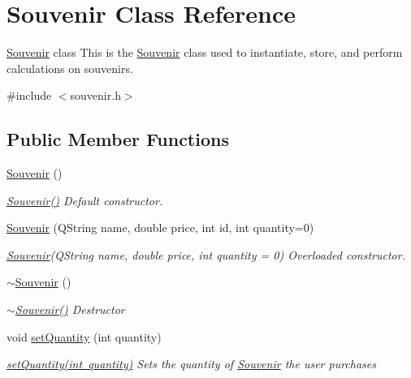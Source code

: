\hypertarget{class_souvenir}{}\section{Souvenir Class Reference}
\label{class_souvenir}


\mbox{\hyperlink{class_souvenir}{Souvenir}} class This is the \mbox{\hyperlink{class_souvenir}{Souvenir}} class used to instantiate, store, and perform calculations on souvenirs.  




{\ttfamily \#include $<$souvenir.\+h$>$}

\subsection*{Public Member Functions}
\begin{DoxyCompactItemize}
\item 
\mbox{\hyperlink{class_souvenir_a1c80e600047ec0e9cc064cf78c79b630}{Souvenir}} ()
\begin{DoxyCompactList}\small\item\em \mbox{\hyperlink{class_souvenir_a1c80e600047ec0e9cc064cf78c79b630}{Souvenir()}} Default constructor. \end{DoxyCompactList}\item 
\mbox{\hyperlink{class_souvenir_a608b5815a4039dc6141ececefb500c77}{Souvenir}} (Q\+String name, double price, int id, int quantity=0)
\begin{DoxyCompactList}\small\item\em \mbox{\hyperlink{class_souvenir}{Souvenir}}(Q\+String name, double price, int quantity = 0) Overloaded constructor. \end{DoxyCompactList}\item 
\mbox{\hyperlink{class_souvenir_ab65358c1194ede77807d924287bc5685}{$\sim$\+Souvenir}} ()
\begin{DoxyCompactList}\small\item\em \mbox{\hyperlink{class_souvenir_ab65358c1194ede77807d924287bc5685}{$\sim$\+Souvenir()}} Destructor \end{DoxyCompactList}\item 
void \mbox{\hyperlink{class_souvenir_a59e2964dafebf5083ba31b19ca5088b5}{set\+Quantity}} (int quantity)
\begin{DoxyCompactList}\small\item\em \mbox{\hyperlink{class_souvenir_a59e2964dafebf5083ba31b19ca5088b5}{set\+Quantity(int quantity)}} Sets the quantity of \mbox{\hyperlink{class_souvenir}{Souvenir}} the user purchases \end{DoxyCompactList}\item 

\end{DoxyCompactItemize}
